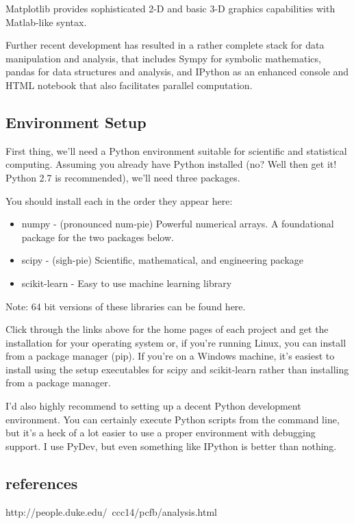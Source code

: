 Matplotlib provides sophisticated 2-D and basic 3-D graphics capabilities with Matlab-like syntax.


Further recent development has resulted in a rather complete stack for data manipulation and analysis, that includes Sympy for symbolic mathematics, pandas for data structures and analysis, and IPython as an enhanced console and HTML notebook that also facilitates parallel computation.



\subsection*{Environment Setup}

First thing, we'll need a Python environment suitable for scientific and statistical computing. Assuming you already have Python installed (no? Well then get it! Python 2.7 is recommended), we'll need three packages. 

You should install each in the order they appear here:

\begin{itemize}
\item numpy - (pronounced num-pie) Powerful numerical arrays. A foundational package for the two packages below.
\item scipy - (sigh-pie) Scientific, mathematical, and engineering package
\item scikit-learn - Easy to use machine learning library
\end{itemize}

Note: 64 bit versions of these libraries can be found here.

Click through the links above for the home pages of each project and get the installation for your operating system or, if you're running Linux, you can install from a package manager (pip). If you're on a Windows machine, it's easiest to install using the setup executables for scipy and scikit-learn rather than installing from a package manager.

I'd also highly recommend to setting up a decent Python development environment. You can certainly execute Python scripts from the command line, but it's a heck of a lot easier to use a proper environment with debugging support. I use PyDev, but even something like IPython is better than nothing.


\subsection*{references}
http://people.duke.edu/~ccc14/pcfb/analysis.html

